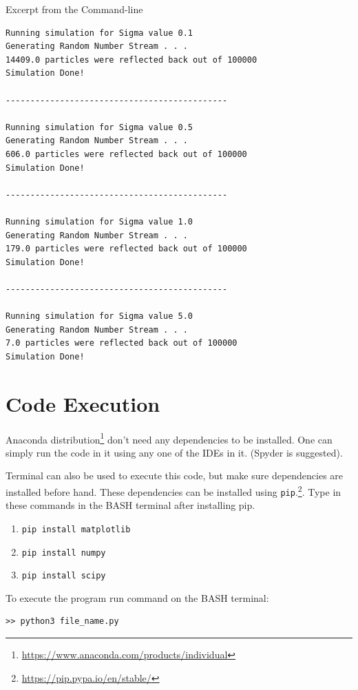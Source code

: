 \documentclass[11pt,a4paper]{article}
\begin{document}
Excerpt from the Command-line
\begin{verbatim}
Running simulation for Sigma value 0.1
Generating Random Number Stream . . . 
14409.0 particles were reflected back out of 100000
Simulation Done!

---------------------------------------------

Running simulation for Sigma value 0.5
Generating Random Number Stream . . .
606.0 particles were reflected back out of 100000
Simulation Done!

---------------------------------------------

Running simulation for Sigma value 1.0
Generating Random Number Stream . . .
179.0 particles were reflected back out of 100000
Simulation Done!

---------------------------------------------

Running simulation for Sigma value 5.0
Generating Random Number Stream . . .
7.0 particles were reflected back out of 100000
Simulation Done!
\end{verbatim}
	
\section{Code Execution}

 Anaconda distribution\footnote{\url{https://www.anaconda.com/products/individual}} don't need any dependencies to be installed. One can simply run the code in it using any one of the IDEs in it. (Spyder is suggested).\medskip

 Terminal can also be used to execute this code, but make sure dependencies are installed before hand. These dependencies can be installed using  \texttt{pip}.\footnote{\url{https://pip.pypa.io/en/stable/}}. Type in these commands in the BASH terminal after installing pip.

\begin{enumerate}
\item \texttt{pip install matplotlib}
\item \texttt{pip install numpy}
\item \texttt{pip install scipy}
\end{enumerate}

To execute the program run command on the BASH terminal:
\begin{verbatim}
>> python3 file_name.py
\end{verbatim}
\end{document}
